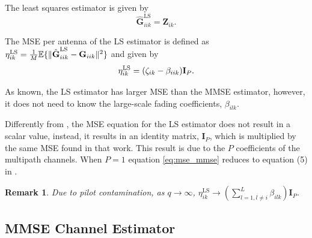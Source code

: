 \documentclass[10pt,journal,comsoc,final]{IEEEtran}
\newtheorem{remark}{Remark}
\begin{document}
The least squares estimator is given by \cite{kay:estimationbook} 
\begin{equation}\label{eq:ls}
\hat{\textbf{G}}_{iik}^{\text{LS}} = \textbf{Z}_{ik}.
\end{equation}

The MSE per antenna of the LS estimator is defined as $\eta_{ik}^{\text{\text{LS}}} = \frac{1}{M} \mathbb{E} \{ \lVert  \hat{\textbf{G}}_{iik}^{\text{LS}} - \textbf{G}_{iik} \rVert^{2} \}$ and given by
\begin{equation}\label{eq:mse_ls}
\eta_{ik}^{\text{\text{LS}}} = (\zeta_{ik} - \beta_{iik}) \textbf{I}_{P}.
\end{equation}

As known, the LS estimator has larger MSE than the MMSE estimator, however, it does not need to know the large-scale fading coefficients, $\beta_{ilk}$.

Differently from \cite{Amin:channelEstPilotCont}, the MSE equation for the LS estimator does not result in a scalar value, instead, it results in an identity matrix, $ \textbf{I}_{P}$, which is multiplied by the same MSE found in that work. This result is due to the $P$ coefficients of the multipath channels. When $P = 1$ equation \eqref{eq:mse_mmse} reduces to equation (5) in \cite{Amin:channelEstPilotCont}.

\begin{remark}Due to pilot contamination, as $q \to\infty $, $\eta_{ik}^{\text{LS}} \to \left( \sum_{l=1,l \neq i}^{L}{\beta_{ilk}} \right) \textbf{I}_{P}$. \end{remark}

\subsection{MMSE Channel Estimator}
\end{document}

